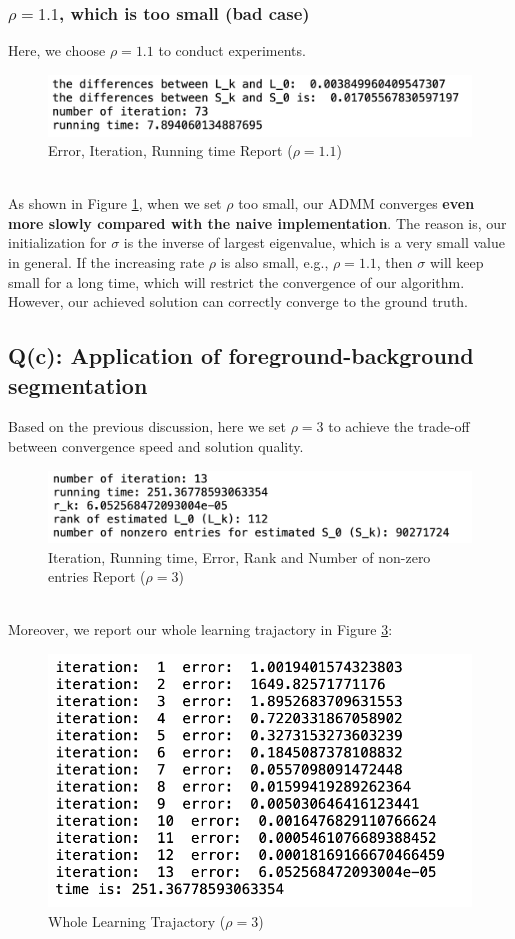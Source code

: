 \documentclass{article}
\begin{document}
\subsubsection{$\rho=1.1$, which is too small (bad case)}
Here, we choose $\rho=1.1$ to conduct experiments.
\begin{figure}[h]
	\centering
	\includegraphics[width=.47\textheight]{qb3.png}
	\caption{Error, Iteration, Running time Report ($\rho=1.1$)}
	\label{fig:qb3}
\end{figure}
\\
As shown in Figure \ref{fig:qb3}, when we set $\rho$ too small, our ADMM converges \textbf{even more slowly compared with the naive implementation}. The reason is, our initialization for $\sigma$ is the inverse of largest eigenvalue, which is a very small value in general. If the increasing rate $\rho$ is also small, e.g., $\rho=1.1$, then $\sigma$ will keep small for a long time, which will restrict the convergence of our algorithm. However, our achieved solution can correctly converge to the ground truth.
\subsection{Q(c): Application of foreground-background segmentation}
Based on the previous discussion, here we set $\rho=3$ to achieve the trade-off between convergence speed and solution quality.
\begin{figure}[!h]
	\centering
	\includegraphics[width=.47\textheight]{qc1.png}
	\caption{Iteration, Running time, Error, Rank and Number of non-zero entries Report ($\rho=3$)}
	\label{fig:qc1}
\end{figure}
\\
Moreover, we report our whole learning trajactory in Figure \ref{fig:qc2}:
\begin{figure}[!h]
	\centering
	\includegraphics[width=.35\textheight]{qc2.png}
	\caption{Whole Learning Trajactory ($\rho=3$)}
	\label{fig:qc2}
\end{figure}
\end{document}
